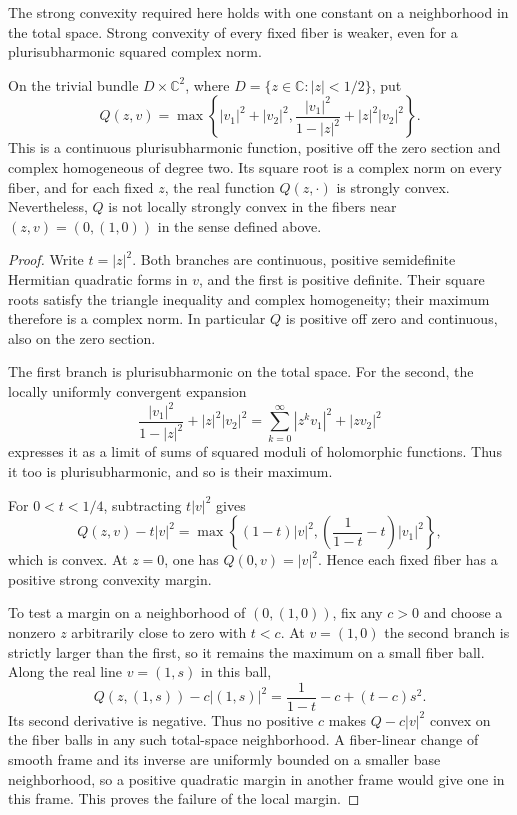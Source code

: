 The strong convexity required here holds with one constant on a
neighborhood in the total space. Strong convexity of every fixed
fiber is weaker, even for a plurisubharmonic squared complex norm.

\begin{example}\label{ex:fiberwise-convexity-without-local-margin}
On the trivial bundle $D\times\mathbb C^2$, where
$D=\{z\in\mathbb C:|z|<1/2\}$, put
\[
 Q(z,v)=\max\left\{
 |v_1|^2+|v_2|^2,
 \frac{|v_1|^2}{1-|z|^2}+|z|^2|v_2|^2
 \right\}.
\]
This is a continuous plurisubharmonic function, positive off
the zero section and complex homogeneous of degree two.
Its square root is a complex norm on every fiber, and for each
fixed $z$, the real function $Q(z,\cdot)$ is strongly convex. Nevertheless,
$Q$ is not locally strongly convex in the fibers near
$(z,v)=(0,(1,0))$ in the sense defined above.
\end{example}
\begin{proof}
Write $t=|z|^2$. Both branches are continuous, positive
semidefinite Hermitian quadratic forms in $v$, and the first
is positive definite. Their square roots satisfy the triangle
inequality and complex homogeneity; their maximum therefore
is a complex norm. In particular $Q$ is positive off zero and
continuous, also on the zero section.

The first branch is plurisubharmonic on the total space.
For the second, the locally uniformly convergent expansion
\[
 \frac{|v_1|^2}{1-|z|^2}+|z|^2|v_2|^2
   =\sum_{k=0}^{\infty}|z^kv_1|^2+|zv_2|^2
\]
expresses it as a limit of sums of squared moduli of holomorphic
functions. Thus it too is plurisubharmonic, and so is their
maximum.

For $0<t<1/4$, subtracting $t|v|^2$ gives
\[
 Q(z,v)-t|v|^2
 =\max\left\{(1-t)|v|^2,
       \left(\frac1{1-t}-t\right)|v_1|^2\right\},
\]
which is convex. At $z=0$, one has $Q(0,v)=|v|^2$.
Hence each fixed fiber has a positive strong convexity margin.

To test a margin on a neighborhood of $(0,(1,0))$, fix any
$c>0$ and choose a nonzero $z$ arbitrarily close to zero with
$t<c$. At $v=(1,0)$ the second branch is strictly larger than
the first, so it remains the maximum on a small fiber ball.
Along the real line $v=(1,s)$ in this ball,
\[
 Q(z,(1,s))-c|(1,s)|^2
   =\frac1{1-t}-c+(t-c)s^2.
\]
Its second derivative is negative. Thus no positive $c$ makes
$Q-c|v|^2$ convex on the fiber balls in any such total-space
neighborhood. A fiber-linear change of smooth frame and its
inverse are uniformly bounded on a smaller base neighborhood,
so a positive quadratic margin in another frame would give
one in this frame. This proves the failure of the local margin.
\end{proof}
